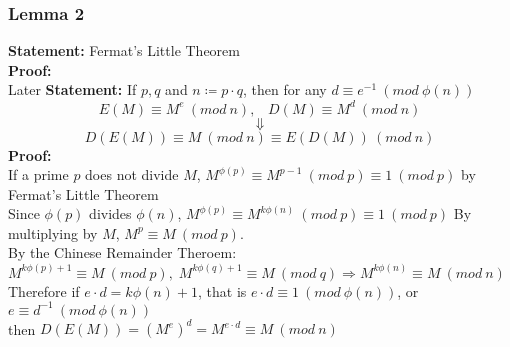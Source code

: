\documentclass{article}
\begin{document}
\subsubsection{Lemma 2}
\textbf{Statement:} Fermat's Little Theorem \\
\textbf{Proof:}\\
Later
\newpage
\textbf{Statement:} If $p, q$ and $n \coloneqq p \cdot q$, then for any $d \equiv e^{-1} \: (mod \: \phi(n))$
\[ E(M) \equiv M^e \: (mod \: n),\;\;\; D(M) \equiv M^d \: (mod \: n)
\]
\[ \Downarrow \]
\[  D(E(M)) \equiv M \: (mod \: n) \equiv E(D(M)) \: (mod \: n)
\]
\textbf{Proof:} \\
If a prime $p$ does not divide $M$,
$M^ {\phi(p)} \equiv M^ {p-1} \: (mod \: p) \equiv 1 \: (mod \: p)$ by Fermat's Little Theorem \\
Since $\phi(p)$ divides $\phi(n)$, $M^{\phi(p)} \equiv M^{k \phi(n)} \: (mod \: p) \equiv 1 \: (mod \: p)$
By multiplying by $M$, $M^p \equiv M \:(mod \: p)$.
\\ By the Chinese Remainder Theroem: \\
$M^{k \phi(p) + 1} \equiv M \: (mod \: p),\; M^{k \phi(q) + 1} \equiv M \: (mod \: q) \Rightarrow M^{k \phi (n)} \equiv M \: (mod \: n)$\\
Therefore if $e \cdot d = k \phi(n) + 1$, that is $e \cdot d \equiv 1 \: (mod \: \phi(n))$, or $e \equiv d^{-1} \: (mod \: \phi(n))$ \\
then $D(E(M)) = (M^{e})^{d} = M^{e \cdot d} \equiv M \: (mod \: n)$
\newpage
\end{document}
